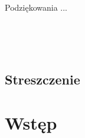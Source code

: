 \documentclass[a4paper,12pt,polish]{book}
\begin{document}
\newpage
\thispagestyle{empty}
\ 
\newpage
\thispagestyle{empty}
\vspace*{0.5\textheight}

\hspace*{0.5\textwidth} \begin{minipage}[c]{0.5\textwidth}
  {\sc Podziękowania ...}
\end{minipage}

\ 
\newpage


\ 
\newpage





\section*{Streszczenie} 

\tableofcontents
\chapter{Wstęp}




\end{document}
